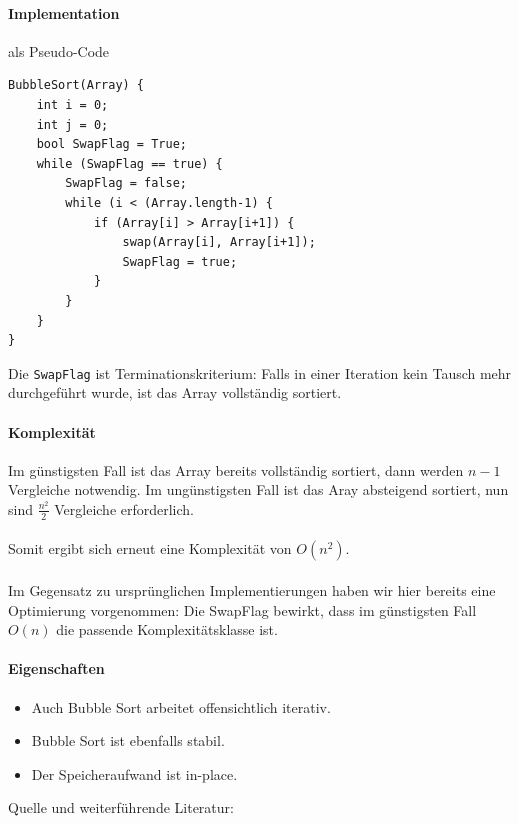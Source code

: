 \documentclass[11pt,a4paper]{scrartcl}
\begin{document}
\paragraph{Implementation} als Pseudo-Code
\begin{lstlisting}
BubbleSort(Array) {
	int i = 0;
	int j = 0;
	bool SwapFlag = True;
	while (SwapFlag == true) {
		SwapFlag = false;
		while (i < (Array.length-1) {	
			if (Array[i] > Array[i+1]) {
				swap(Array[i], Array[i+1]);
				SwapFlag = true;			
			}
		}	
	}
}
\end{lstlisting}
Die \texttt{SwapFlag} ist Terminationskriterium: Falls in einer Iteration kein Tausch mehr durchgeführt wurde, ist das Array vollständig sortiert.
\paragraph{Komplexität}
Im günstigsten Fall ist das Array bereits vollständig sortiert, dann werden $n-1$ Vergleiche notwendig. Im ungünstigsten Fall ist das Aray absteigend sortiert, nun sind $\frac{n^{2}}{2}$ Vergleiche erforderlich. \\\\
Somit ergibt sich erneut eine Komplexität von $O(n^{2})$. \\\\
Im Gegensatz zu ursprünglichen Implementierungen haben wir hier bereits eine Optimierung vorgenommen: Die SwapFlag bewirkt, dass im günstigsten Fall $O(n)$ die passende Komplexitätsklasse ist.
\paragraph{Eigenschaften}
\begin{itemize}
\item Auch Bubble Sort arbeitet offensichtlich iterativ.
\item Bubble Sort ist ebenfalls stabil.
\item Der Speicheraufwand ist in-place.
\end{itemize}
Quelle und weiterführende Literatur: \parencite[][S.86 ff.]{Wirth} \parencite[][S.22]{Taschenbuch}
\end{document}
